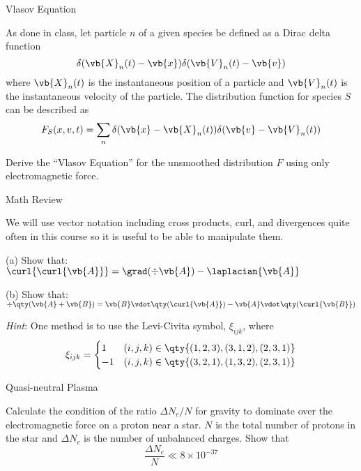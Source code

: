 \documentclass[12pt]{article}
\begin{document}
\begin{problem}[Problem 2.]{Vlasov Equation}

As done in class, let particle $n$ of a given species be defined as a Dirac
delta function
\begin{equation}
    \delta(\vb{X}_n(t)-\vb{x})\delta(\vb{V}_n(t)-\vb{v}) 
\end{equation}
where $\vb{X}_n(t)$ is the instantaneous position of a particle and
$\vb{V}_n(t)$ is the instantaneous velocity of the particle. The distribution
function for species $S$ can be described as
\begin{equation}
    F_S(x,v,t)=\sum_n\delta(\vb{x}-\vb{X}_n(t))\delta(\vb{v}-\vb{V}_n(t)) 
\end{equation}

Derive the ``Vlasov Equation'' for the unsmoothed distribution $F$ using only
electromagnetic force.
    
\end{problem}


\begin{problem}[Problem 3.]{Math Review}

We will use vector notation including cross products, curl, and divergences
quite often in this course so it is useful to be able to manipulate them.

(a) Show that: $\curl{\curl{\vb{A}}}=\grad(\div{\vb{A}})-\laplacian{\vb{A}}$

(b) Show that:
$\div{\qty(\vb{A}+\vb{B})}=\vb{B}\vdot\qty(\curl{\vb{A}})-\vb{A}\vdot\qty(\curl{\vb{B}})$

\textit{Hint}: One method is to use the Levi-Civita symbol, $\xi_{ijk}$, where
\begin{equation}
    \xi_{ijk}=\begin{cases}
        1&(i,j,k)\in\qty{(1,2,3),(3,1,2),(2,3,1)}\\
        -1&(i,j,k)\in\qty{(3,2,1),(1,3,2),(2,3,1)}
    \end{cases}
\end{equation}

\end{problem}


\begin{problem}[Problem 4.]{Quasi-neutral Plasma}

Calculate the condition of the ratio $\Delta N_c/N$ for gravity to dominate over
the electromagnetic force on a proton near a star. $N$ is the total number of
protons in the star and $\Delta N_c$ is the number of unbalanced charges. Show
that
\begin{equation}
    \frac{\Delta N_c}{N}\ll8\times10^{-37} 
\end{equation}
    
\end{problem}
\end{document}
